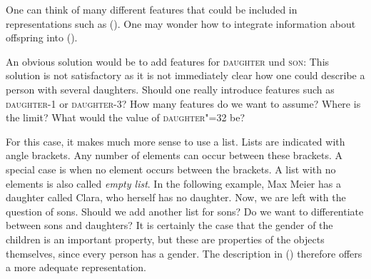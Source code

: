 One can think of many different features that could be included in representations such as (). One may wonder how
to integrate information about offspring into ().

An obvious solution would be to add features for \textsc{daughter} und \textsc{son}:
\ea
{}
\z
This solution is not satisfactory as it is not immediately clear how one could describe a person with several daughters.
Should one really introduce features such as \textsc{daughter-1} or \textsc{daughter-3}?
\ea
{}
\z
How many features do we want to assume? Where is the limit?
What would the value of \textsc{daughter"=32} be?

For this case, it makes much more sense to use a list. Lists are indicated with angle brackets. Any number of elements can occur between
these brackets. A special case is when no element occurs between the brackets. A list with no
elements is also called \emph{empty list}. In the following example,
Max Meier has a daughter called Clara, who herself has no daughter.
\ea
{}
\z
Now, we are left with the question of sons. Should we add another list for sons? Do we want to differentiate between sons and daughters?
It is certainly the case that the gender of the children is an important property, but these are
properties of the objects themselves, since every person has a gender. The description in () therefore offers a more adequate representation.


